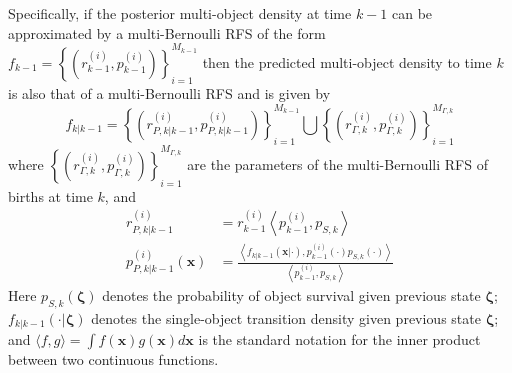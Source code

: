\documentclass[twocolumn]{autart}
\begin{document}
Specifically, if the posterior multi-object density at time $k-1$ can be approximated by a
multi-Bernoulli RFS of the form  $f_{k-1}=\left\{ \left( r_{k-1}^{(i)},p_{k-1}^{(i)}\right) \right\}
_{i=1}^{M_{k-1}}$ then the predicted multi-object density to time $k$ is also that of a
multi-Bernoulli RFS and is given by
\begin{equation}
f_{k|k-1}=\left\{ \left( r_{P,k|k-1}^{(i)},p_{P,k|k-1}^{(i)}\right) \right\}
_{i=1}^{M_{k-1}}\bigcup \left\{ \left( r_{\Gamma ,k}^{(i)},p_{\Gamma
,k}^{(i)}\right) \right\} _{i=1}^{M_{\Gamma ,k}}  \label{pred_den}
\end{equation}where $\left\{ \left( r_{\Gamma ,k}^{(i)},p_{\Gamma ,k}^{(i)}\right)
\right\} _{i=1}^{M_{\Gamma ,k}}$ are the parameters of the multi-Bernoulli
RFS of births at time $k$, and
\begin{align}
r_{P,k|k-1}^{(i)}& =r_{k-1}^{(i)}\left\langle
p_{k-1}^{(i)},p_{S,k}\right\rangle  \\
p_{P,k|k-1}^{(i)}(\mathbf{x})& =\frac{\left\langle f_{k|k-1}(\mathbf{x}|\cdot ),p_{k-1}^{(i)}(\cdot )p_{S,k}(\cdot )\right\rangle }{\left\langle
p_{k-1}^{(i)},p_{S,k}\right\rangle }
\end{align}Here $p_{S,k}(\mathbf{\zeta })$ denotes the probability of object survival
given previous state $\mathbf{\zeta }$; $f_{k|k-1}(\mathbf{\cdot }|\mathbf{\zeta })$ denotes the single-object transition density given
previous state $\mathbf{\zeta }$; and $\langle f,g\rangle =\int f(\mathbf{x})g(\mathbf{x})d\mathbf{x}$ is the standard notation for the inner product
between two continuous functions.
\end{document}
